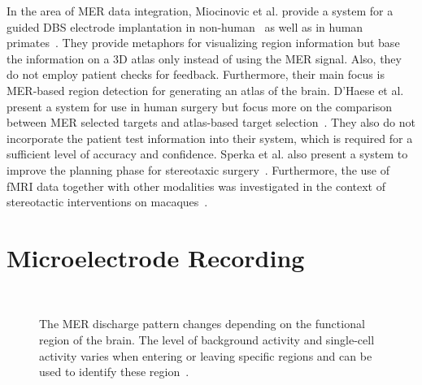 \documentclass[review]{vgtc}                 %
\begin{document}
In the area of MER data integration, Miocinovic et al. provide a system for a guided DBS electrode implantation in non-human~\cite{Miocinovic2007} as well as in human primates~\cite{Cicerone2}. They provide metaphors for visualizing region information but base the information on a 3D atlas only instead of using the MER signal. Also, they do not employ patient checks for feedback. Furthermore, their main focus is MER-based region detection for generating an atlas of the brain. D'Haese et al. present a system for use in human surgery but focus more on the comparison between MER selected targets and atlas-based target selection~\cite{Haese2005}. They also do not incorporate the patient test information into their system, which is required for a sufficient level of accuracy and confidence. Sperka et al. also present a system to improve the planning phase for stereotaxic surgery~\cite{Sperka2011}. Furthermore, the use of fMRI data together with other modalities was investigated in the context of stereotactic interventions on macaques~\cite{Ohayon2012}.
%
%
%

\section{Microelectrode Recording}\label{sec:mer}
\begin{figure}
    \centering
    \\
    \caption{The MER discharge pattern changes depending on the functional region of the brain. The level of background activity and single-cell activity varies when entering or leaving specific regions and can be used to identify these region~\cite{Benazzouz2002,Hutchison1998}.}
    \label{fig:dischargepatterns}
\end{figure}
\end{document}
